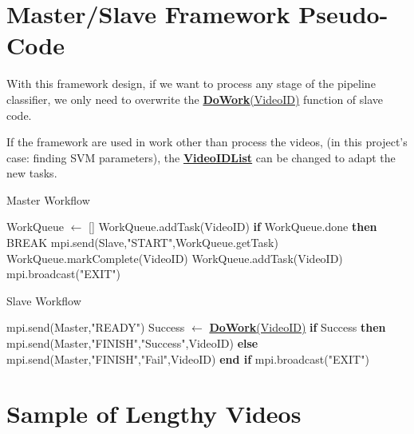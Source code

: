 \documentclass[bsc,logo,twoside,fullspacing,parskip]{infthesis}
\begin{document}
\begin{appendices}

\chapter{Master/Slave Framework Pseudo-Code}

With this framework design, if we want to process any stage of the pipeline classifier, we only need to overwrite the \underline{\textbf{DoWork}(VideoID)} function of slave code.

If the framework are used in work other than process the videos, (in this project's case: finding SVM parameters), the  \underline{\textbf{VideoIDList}} can be changed to adapt the new tasks.

\begin{algorithm}
\caption{Master Workflow}
\begin{algorithmic}
\STATE WorkQueue $\leftarrow$ []
	\STATE WorkQueue.addTask(VideoID)
\ENDFOR
{}
		\STATE \textbf{if} WorkQueue.done \textbf{then} BREAK 
		\STATE mpi.send(Slave,"START",WorkQueue.getTask)
	\ENDFOR
		\STATE WorkQueue.markComplete(VideoID)
			\STATE WorkQueue.addTask(VideoID)
		\ENDIF
	\ENDFOR
\ENDWHILE
\STATE mpi.broadcast("EXIT")
\end{algorithmic} 
\end{algorithm}

\begin{algorithm}
\caption{Slave Workflow}
\begin{algorithmic}
	\STATE mpi.send(Master,"READY")
		\STATE Success $\leftarrow$ \underline{\textbf{DoWork}(VideoID)}
		\STATE \textbf{if} Success \textbf{then}
		\STATE \hspace{10pt}mpi.send(Master,"FINISH","Success",VideoID)
		\STATE \textbf{else}
		\STATE \hspace{10pt}mpi.send(Master,"FINISH","Fail",VideoID)
		\STATE \textbf{end if}
	\ENDIF
\ENDWHILE
\STATE mpi.broadcast("EXIT")
\end{algorithmic} 
\end{algorithm}

\chapter{Sample of Lengthy Videos}
\label{sec:samplelong}


\end{appendices}
\end{document}
